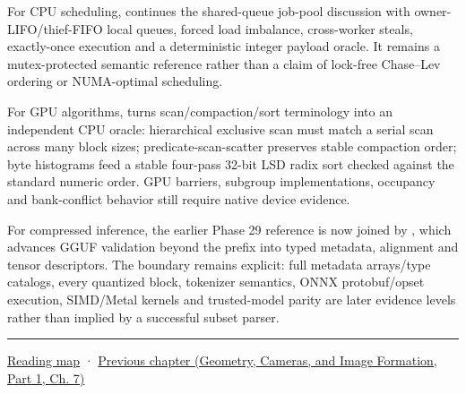For CPU scheduling,  continues the shared-queue job-pool discussion with owner-LIFO/thief-FIFO local queues, forced load imbalance, cross-worker steals, exactly-once execution and a deterministic integer payload oracle. It remains a mutex-protected semantic reference rather than a claim of lock-free Chase--Lev ordering or NUMA-optimal scheduling.

For GPU algorithms,  turns scan/compaction/sort terminology into an independent CPU oracle: hierarchical exclusive scan must match a serial scan across many block sizes; predicate-scan-scatter preserves stable compaction order; byte histograms feed a stable four-pass 32-bit LSD radix sort checked against the standard numeric order. GPU barriers, subgroup implementations, occupancy and bank-conflict behavior still require native device evidence.

For compressed inference, the earlier Phase 29 reference is now joined by , which advances GGUF validation beyond the prefix into typed metadata, alignment and tensor descriptors. The boundary remains explicit: full metadata arrays/type catalogs, every quantized block, tokenizer semantics, ONNX protobuf/opset execution, SIMD/Metal kernels and trusted-model parity are later evidence levels rather than implied by a successful subset parser.

\begin{center}\rule{0.5\linewidth}{0.5pt}\end{center}

\hyperref[volume-reading-map]{Reading map} · \href{../03-Geometry-Cameras-and-Image-Formation-P01/main.pdf\#02-foundations-ii-ch038-reconstruct-the-complete-geometry-pipeline}{Previous chapter (Geometry, Cameras, and Image Formation, Part 1, Ch. 7)}
